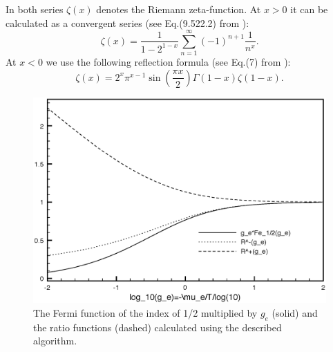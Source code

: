 In both series $\zeta(x)$ denotes the Riemann zeta-function.
At $x > 0$ it can be calculated as a convergent series (see Eq.(9.522.2) from \cite{gradshtein}): %
\begin{equation}
\zeta(x) = \frac{1}{1-2^{1-x}} \sum_{n=1}^\infty{(-1)^{n+1} \frac{1}{n^x}}.
\end{equation}
At $x < 0$ we use the following reflection formula (see Eq.(7) from \cite{mcleod}): %
\begin{equation}
\zeta(x) = 2^x \pi^{x-1} \sin(\frac{\pi x}{2}) \Gamma(1-x) \zeta(1-x).
\end{equation}

\begin{figure}[ht]
\centering
\includegraphics[scale=0.6]{FermiFunction.eps}
\caption{The Fermi function of the index of 1/2 multiplied by $g_e$ (solid) and the ratio functions (dashed) calculated using the described algorithm.}
\end{figure}

